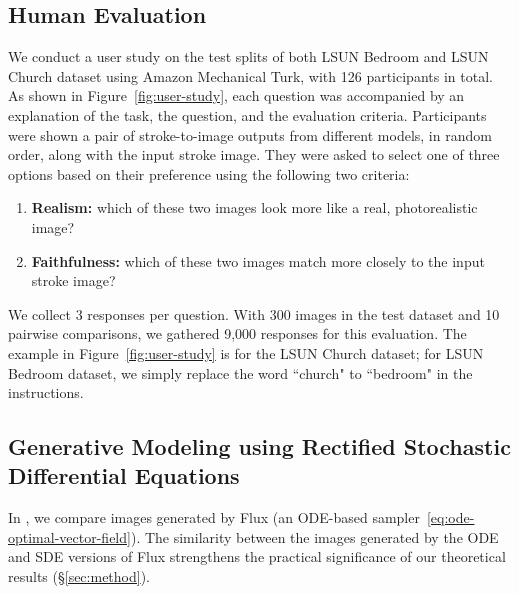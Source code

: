 \documentclass{article} %
\theoremstyle{plain}
\begin{document}
\subsection{Human Evaluation}
\label{sec:human-eval}
We conduct a user study on the test splits of both LSUN Bedroom and LSUN Church dataset using Amazon Mechanical Turk, with 126 participants in total.
As shown in Figure~\ref{fig:user-study}, each question was accompanied by an explanation of the task, the question, and the evaluation criteria.
Participants were shown a pair of stroke-to-image outputs from different models, in random order, along with the input stroke image. 
They were asked to select one of three options based on their preference using the following two criteria:
\begin{enumerate}
    \item \textbf{Realism:} which of these two images look more like a real, photorealistic image?
    \item \textbf{Faithfulness:} which of these two images match more closely to the input stroke image?
\end{enumerate}

We collect 3 responses per question. 
With 300 images in the test dataset and 10 pairwise comparisons, we gathered 9,000 responses for this evaluation. 
The example in Figure~\ref{fig:user-study} is for the LSUN Church dataset; for LSUN Bedroom dataset, we simply replace the word ``church" to ``bedroom" in the instructions.


\subsection{Generative Modeling using Rectified Stochastic Differential Equations}
\label{sec:appl-rsde}
In , we compare images generated by Flux (an ODE-based sampler~\eqref{eq:ode-optimal-vector-field}).
The similarity between the images generated by the ODE and SDE versions of Flux strengthens the practical significance of our theoretical results (\S\ref{sec:method}). 
\end{document}
